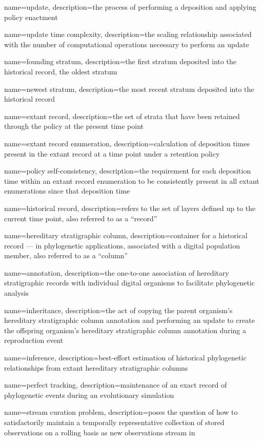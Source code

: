{
    name=update,
    description={the process of performing a deposition and applying policy enactment}
}

{
    name=update time complexity,
    description={the scaling relationship associated with the number of computational operations necessary to perform an update}
}

{
    name=founding stratum,
    description={the first stratum deposited into the historical record, the oldest stratum}
}

{
    name=newest stratum,
    description={the most recent stratum deposited into the historical record}
}

{
    name=extant record,
    description={the set of strata that have been retained through the policy at the present time point}
}

{
    name=extant record enumeration,
    description={calculation of deposition times present in the extant record at a time point under a retention policy}
}

{
    name=policy self-consistency,
    description={the requirement for each deposition time within an extant record enumeration to be consistently present in all extant enumerations since that deposition time}
}

{
    name=historical record,
    description={refers to the set of layers defined up to the current time point, also referred to as a ``record''}
}

{
    name=hereditary stratigraphic column,
    description={container for a historical record --- in phylogenetic applications, associated with a digital population member, also referred to as a ``column''}
}

{
    name=annotation,
    description={the one-to-one association of hereditary stratigraphic records with individual digital organisms to facilitate phylogenetic analysis}
}

{
    name=inheritance,
    description={the act of copying the parent organism's hereditary stratigraphic column annotation and performing an update to create the offspring organism's hereditary stratigraphic column annotation during a reproduction event}
}

{
    name=inference,
    description={best-effort estimation of historical phylogenetic relationships from extant hereditary stratigraphic columns}
}

{
    name=perfect tracking,
    description={maintenance of an exact record of phylogenetic events during an evolutionary simulation}
}

{
    name=stream curation problem,
    description={poses the question of how to satisfactorily maintain a temporally representative collection of stored observations on a rolling basis as new observations stream in}
}
